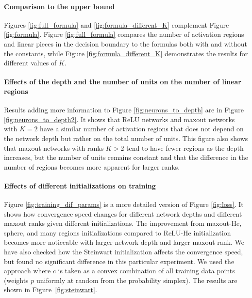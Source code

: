 \documentclass{article}
\theoremstyle{definition}
\begin{document}
\paragraph{Comparison to the upper bound} 
Figures \ref{fig:full_formula} and  \ref{fig:formula_different_K} complement Figure \ref{fig:formula}. Figure \ref{fig:full_formula} compares the number of activation regions and linear pieces in the decision boundary to the formulas both with and without the constants, while Figure \ref{fig:formula_different_K} demonstrates the results for different values of $K$. 

\paragraph{Effects of the depth and the number of units on the number of linear regions}
Results adding more information to Figure \ref{fig:neurons_to_depth} are in Figure \ref{fig:neurons_to_depth2}. It shows that ReLU networks and maxout networks with $K = 2$ have a similar number of activation regions that does not depend on the network depth but rather on the total number of units. This figure also shows that maxout networks with ranks $K > 2$ tend to have fewer regions as the depth increases, but the number of units remains constant and that the difference in the number of regions becomes more apparent for larger ranks. 

\paragraph{Effects of different initializations on training}
Figure \ref{fig:training_dif_params} is a more detailed version of Figure \ref{fig:loss}. It shows how convergence speed changes for different network depths and different maxout ranks given different initializations. 
The improvement from maxout-He, sphere, and many regions initializations compared to ReLU-He initialization becomes more noticeable with larger network depth and larger maxout rank. 
We have also checked how the Steinwart initialization affects the convergence speed, but found no significant difference in this particular experiment. We used the approach where $c$ is taken as a convex combination of all training data points (weights $p$ uniformly at random from the probability simplex). The results are shown in Figure~\ref{fig:steinwart}. 
    
\end{document}
